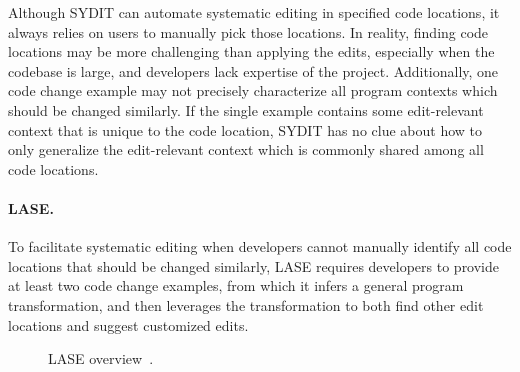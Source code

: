 \documentclass[runningheads,a4paper]{llncs}
\begin{document}
Although SYDIT can automate systematic editing in specified code locations, it always relies on users to manually pick those locations. In reality, finding code locations may be more challenging than applying the edits, especially when the codebase is large, and developers lack expertise of the project. Additionally, one code change example may not precisely characterize all program contexts which should be changed similarly. If the single example contains some edit-relevant context that is unique to the code location, SYDIT has no clue about how to only generalize the edit-relevant context which is commonly shared among all code locations.


\paragraph{LASE.} To facilitate systematic editing when developers cannot manually identify all code locations that should be changed similarly, LASE requires developers to provide at least two code change examples, from which it infers a general program transformation, and then leverages the transformation to both find other edit locations and suggest customized edits. 

\begin{figure}
\centering
{}
\caption{LASE overview~\cite{MKM2013}.}
\label{fig:laseoverview}
\end{figure}
\end{document}
